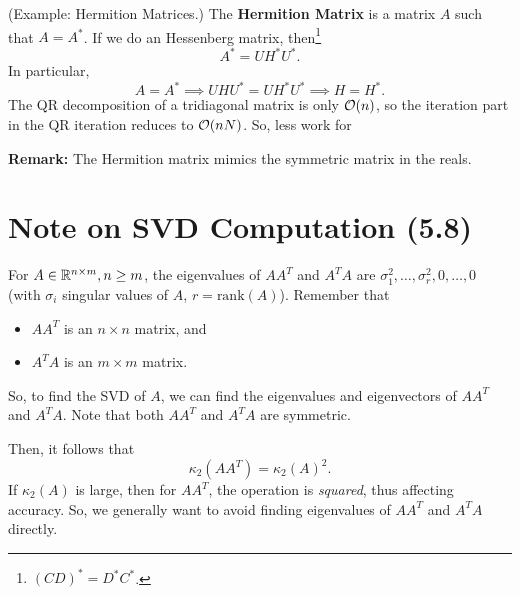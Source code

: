 \documentclass[letterpaper]{article}
\newcommand{\0}{\mathbf{0}}
\begin{document}
\begin{mdframed}
    (Example: Hermition Matrices.) The \textbf{Hermition Matrix} is a matrix $A$ such that $A = A^*$. If we do an Hessenberg matrix, then\footnote{$(CD)^* = D^* C^*$.} \[A^* = UH^* U^*.\] In particular, 
    \[A = A^* \implies UHU^* = UH^* U^* \implies H = H^*.\] 
    The QR decomposition of a tridiagonal matrix is only $\mathcal{O}(n)$, so the iteration part in the QR iteration reduces to $\mathcal{O}(nN)$. So, less work for %
\end{mdframed}
\textbf{Remark:} The Hermition matrix mimics the symmetric matrix in the reals.

\section{Note on SVD Computation (5.8)}
For $A \in \mathbb{R}^{n \times m}, n \geq m$, the eigenvalues of $AA^T$ and $A^T A$ are $\sigma_1^2, \hdots, \sigma_r^2, 0, \hdots, 0$ (with $\sigma_i$ singular values of $A$, $r = \text{rank}(A)$). Remember that 
\begin{itemize}
    \item $AA^T$ is an $n \times n$ matrix, and 
    \item $A^T A$ is an $m \times m$ matrix.
\end{itemize}
So, to find the SVD of $A$, we can find the eigenvalues and eigenvectors of $AA^T$ and $A^T A$. Note that both $AA^T$ and $A^T A$ are symmetric. 

\bigskip 

Then, it follows that \[\kappa_{2}(AA^T) = \kappa_{2}(A)^2.\] If $\kappa_{2}(A)$ is large, then for $AA^T$, the operation is \emph{squared}, thus affecting accuracy. So, we generally want to avoid finding eigenvalues of $AA^T$ and $A^T A$ directly.
\end{document}
